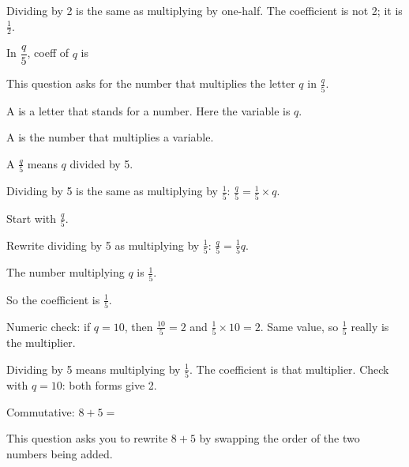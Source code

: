 
Dividing by 2 is the same as multiplying by one-half. The coefficient is not 2; it is $\tfrac{1}{2}$.


In $\dfrac{q}{5}$, coeff of $q$ is \blank[1.8cm]


This question asks for the number that multiplies the letter $q$ in $\tfrac{q}{5}$.

\begin{words}
  \item A is a letter that stands for a number. Here the variable is $q$.
  \item A is the number that multiplies a variable.
  \item A $\tfrac{q}{5}$ means $q$ divided by 5.
  \item Dividing by 5 is the same as multiplying by $\tfrac{1}{5}$: $\tfrac{q}{5} = \tfrac{1}{5} \times q$.
\end{words}

\begin{steps}
  \item Start with $\tfrac{q}{5}$.
  \item Rewrite dividing by 5 as multiplying by $\tfrac{1}{5}$: $\tfrac{q}{5} = \tfrac{1}{5}q$.
  \item The number multiplying $q$ is $\tfrac{1}{5}$.
  \item So the coefficient is $\tfrac{1}{5}$.
  \item Numeric check: if $q = 10$, then $\tfrac{10}{5} = 2$ and $\tfrac{1}{5} \times 10 = 2$. Same value, so $\tfrac{1}{5}$ really is the multiplier.
\end{steps}


Dividing by 5 means multiplying by $\tfrac{1}{5}$. The coefficient is that multiplier. Check with $q = 10$: both forms give 2.


Commutative: $8 + 5 = $\ansblank


This question asks you to rewrite $8 + 5$ by swapping the order of the two numbers being added.

